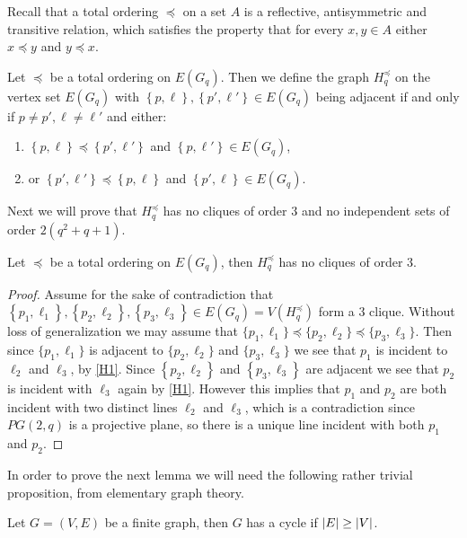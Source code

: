 Recall that a total ordering $\preccurlyeq$ on a set $A$ is a reflective, antisymmetric and transitive relation, which satisfies the property that for every $x, y \in A$ either $x \preccurlyeq y$ and $y \preccurlyeq x$.
\begin{definition}
	Let $\preccurlyeq$ be a total ordering on $E(G_q)$. Then we define the graph $H_q^{\preccurlyeq}$ on the vertex set $E(G_q)$ with $\left\{p, \ell\right\}, \left\{p', \ell'\right\} \in E(G_q)$ being adjacent if and only if $p \neq p', \ell \neq \ell'$ and either:
	\begin{enumerate}[label=(H\arabic*), leftmargin=*]
		\item $\left\{p, \ell\right\} \preccurlyeq \left\{p', \ell'\right\}$ and $\left\{p, \ell'\right\} \in E(G_q)$, \label{H1}
		\item or $\left\{p', \ell'\right\} \preccurlyeq \left\{p, \ell\right\}$ and $\left\{p', \ell\right\} \in E(G_q)$. \label{H2}
	\end{enumerate}
\end{definition}
Next we will prove that $H_q^{\preccurlyeq}$ has no cliques of order $3$ and no independent sets of order $2(q^2 + q + 1)$.
\begin{lemma}\label{lem:no_triangles}
	Let $\preccurlyeq$ be a total ordering on $E(G_q)$, then $H_q^{\preccurlyeq}$ has no cliques of order $3$.
\end{lemma}
\begin{proof}
	Assume for the sake of contradiction that $\left\{p_1, \ell_1\right\}, \left\{p_2, \ell_2\right\}, \left\{p_3, \ell_3\right\} \in E(G_q) = V(H_q^{\preccurlyeq})$ form a $3$ clique. Without loss of generalization we may assume that $\{p_1, \ell_1\} \preccurlyeq \{p_2, \ell_2\}\preccurlyeq \{p_3, \ell_3\}$. Then since $\{p_1, \ell_1\}$ is adjacent to $\{p_2, \ell_2\}$ and $\{p_3, \ell_3\}$ we see that $p_1$ is incident to $\ell_2$ and $\ell_3$, by \ref{H1}. Since $\left\{p_2, \ell_2\right\}$ and $\left\{p_3, \ell_3\right\}$ are adjacent we see that $p_2$ is incident with $\ell_{3}$ again by \ref{H1}.
	However this implies that $p_1$ and $p_2$ are both incident with two distinct lines $\ell_2$ and $\ell_3$, which is a contradiction since $PG(2, q)$ is a projective plane, so there is a unique line incident with both $p_1$ and $p_2$.
\end{proof}
In order to prove the next lemma we will need the following rather trivial proposition, from elementary graph theory.
\begin{proposition}\label{prop:cycle_in_graph}
	Let $G = (V, E)$ be a finite graph, then $G$ has a cycle if $\left\lvert E\right\rvert \geq \left\lvert V\right\rvert$.
\end{proposition}
